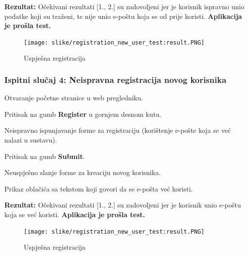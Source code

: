 			\noindent \textbf{Rezultat:} Očekivani rezultati [1., 2.] su zadovoljeni jer je korisnik ispravno unio podatke koji su traženi, te nije unio e-poštu koja se od prije koristi. \textbf{Aplikacija je prošla test.}
			
			\begin{figure}[H]
				\texttt{[image: slike/registration\_new\_user\_test:result.PNG]}
				\centering
				\caption{Uspješna registracija}
				\label{fig:sucess_register}
			\end{figure}
			
			\subsubsection{Ispitni slučaj 4: Neispravna registracija novog korisnika}
			
			
			\begin{packed_enum}
				
				\item  Otvaranje početne stranice u web pregledniku.
				\item  Pritisak na gumb \textbf{Register} u gornjem desnom kutu.
				\item  Neispravno ispunjavanje forme za registraciju (korištenje e-pošte koja se već nalazi u sustavu).
				\item  Pritisak na gumb \textbf{Submit}. 
				
			\end{packed_enum}
			
			\begin{packed_enum}
				
				\item  Neuspješno slanje forme za kreaciju novog korisnika.
				\item  Prikaz oblačića sa tekstom koji govori da se e-pošta već koristi.
				
			\end{packed_enum}
			
			\noindent \textbf{Rezultat:} Očekivani rezultati [1., 2.] su zadovoljeni jer je korisnik unio e-poštu koja se već koristi. \textbf{Aplikacija je prošla test.}
			
			\begin{figure}[H]
				\texttt{[image: slike/registration\_new\_user\_test:result.PNG]}
				\centering
				\caption{Uspješna registracija}
				\label{fig:failed_register}
			\end{figure}
			
